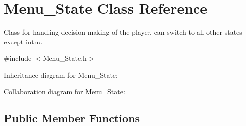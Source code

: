 \hypertarget{classMenu__State}{}\section{Menu\+\_\+\+State Class Reference}
\label{classMenu__State}


Class for handling decision making of the player, can switch to all other states except intro.  




{\ttfamily \#include $<$Menu\+\_\+\+State.\+h$>$}



Inheritance diagram for Menu\+\_\+\+State\+:


Collaboration diagram for Menu\+\_\+\+State\+:
\subsection*{Public Member Functions}
